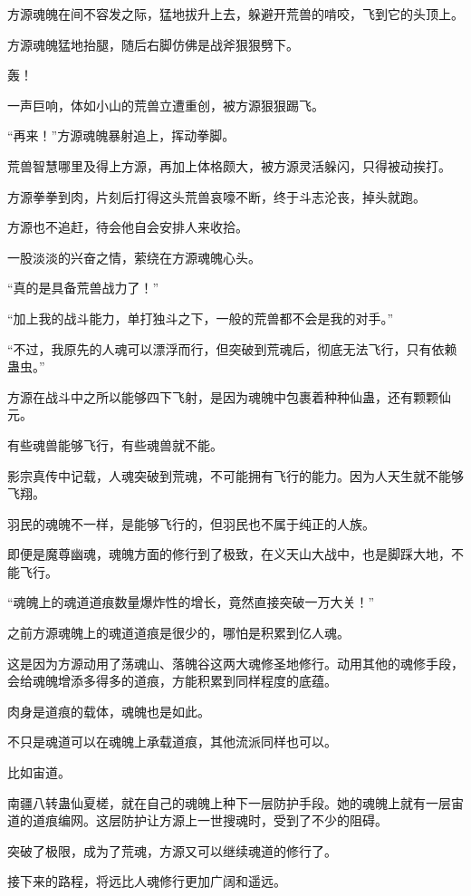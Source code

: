 \begin{this_body}
方源魂魄在间不容发之际，猛地拔升上去，躲避开荒兽的啃咬，飞到它的头顶上。

方源魂魄猛地抬腿，随后右脚仿佛是战斧狠狠劈下。

轰！

一声巨响，体如小山的荒兽立遭重创，被方源狠狠踢飞。

“再来！”方源魂魄暴射追上，挥动拳脚。

荒兽智慧哪里及得上方源，再加上体格颇大，被方源灵活躲闪，只得被动挨打。

方源拳拳到肉，片刻后打得这头荒兽哀嚎不断，终于斗志沦丧，掉头就跑。

方源也不追赶，待会他自会安排人来收拾。

一股淡淡的兴奋之情，萦绕在方源魂魄心头。

“真的是具备荒兽战力了！”

“加上我的战斗能力，单打独斗之下，一般的荒兽都不会是我的对手。”

“不过，我原先的人魂可以漂浮而行，但突破到荒魂后，彻底无法飞行，只有依赖蛊虫。”

方源在战斗中之所以能够四下飞射，是因为魂魄中包裹着种种仙蛊，还有颗颗仙元。

有些魂兽能够飞行，有些魂兽就不能。

影宗真传中记载，人魂突破到荒魂，不可能拥有飞行的能力。因为人天生就不能够飞翔。

羽民的魂魄不一样，是能够飞行的，但羽民也不属于纯正的人族。

即便是魔尊幽魂，魂魄方面的修行到了极致，在义天山大战中，也是脚踩大地，不能飞行。

“魂魄上的魂道道痕数量爆炸性的增长，竟然直接突破一万大关！”

之前方源魂魄上的魂道道痕是很少的，哪怕是积累到亿人魂。

这是因为方源动用了荡魂山、落魄谷这两大魂修圣地修行。动用其他的魂修手段，会给魂魄增添多得多的道痕，方能积累到同样程度的底蕴。

肉身是道痕的载体，魂魄也是如此。

不只是魂道可以在魂魄上承载道痕，其他流派同样也可以。

比如宙道。

南疆八转蛊仙夏槎，就在自己的魂魄上种下一层防护手段。她的魂魄上就有一层宙道的道痕编网。这层防护让方源上一世搜魂时，受到了不少的阻碍。

突破了极限，成为了荒魂，方源又可以继续魂道的修行了。

接下来的路程，将远比人魂修行更加广阔和遥远。


\end{this_body}
